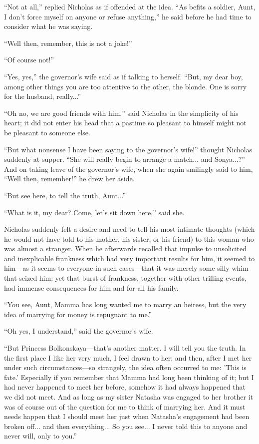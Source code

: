 ``Not at all,'' replied Nicholas as if offended at the idea. ``As
befits a soldier, Aunt, I don't force myself on anyone or refuse
anything,'' he said before he had time to consider what he was
saying.

``Well then, remember, this is not a joke!''

``Of course not!''

``Yes, yes,'' the governor's wife said as if talking to
herself. ``But, my dear boy, among other things you are too
attentive to the other, the blonde. One is sorry for the husband,
really...''

``Oh no, we are good friends with him,'' said Nicholas in the
simplicity of his heart; it did not enter his head that a pastime
so pleasant to himself might not be pleasant to someone else.

``But what nonsense I have been saying to the governor's wife!''
thought Nicholas suddenly at supper. ``She will really begin to
arrange a match... and Sonya...?'' And on taking leave of the
governor's wife, when she again smilingly said to him, ``Well
then, remember!'' he drew her aside.

``But see here, to tell the truth, Aunt...''

``What is it, my dear? Come, let's sit down here,'' said she.

Nicholas suddenly felt a desire and need to tell his most
intimate thoughts (which he would not have told to his mother,
his sister, or his friend) to this woman who was almost a
stranger. When he afterwards recalled that impulse to unsolicited
and inexplicable frankness which had very important results for
him, it seemed to him---as it seems to everyone in such
cases---that it was merely some silly whim that seized him: yet
that burst of frankness, together with other trifling events, had
immense consequences for him and for all his family.

``You see, Aunt, Mamma has long wanted me to marry an heiress,
but the very idea of marrying for money is repugnant to me.''

``Oh yes, I understand,'' said the governor's wife.

``But Princess Bolkonskaya---that's another matter. I will tell
you the truth. In the first place I like her very much, I feel
drawn to her; and then, after I met her under such
circumstances---so strangely, the idea often occurred to me:
'This is fate.' Especially if you remember that Mamma had long
been thinking of it; but I had never happened to meet her before,
somehow it had always happened that we did not meet. And as long
as my sister Natasha was engaged to her brother it was of course
out of the question for me to think of marrying her. And it must
needs happen that I should meet her just when Natasha's
engagement had been broken off... and then everything... So you
see... I never told this to anyone and never will, only to you.''

